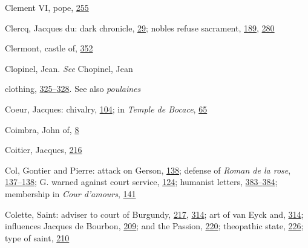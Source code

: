 Clement VI, pope,
\protect\hyperlink{17_Chapter_Ten__THE_FAILURE_OF_IMAG.xhtmlux5cux23page_255}{255}

Clercq, Jacques du: dark chronicle,
\protect\hyperlink{08_Chapter_One__THE_PASSIONATE_INTE.xhtmlux5cux23page_29}{29};
nobles refuse sacrament,
\protect\hyperlink{13_Chapter_Six__THE_DEPICTION_OF_TH.xhtmlux5cux23page_189}{189},
\protect\hyperlink{18_Chapter_Eleven__THE_FORMS_OF_THO.xhtmlux5cux23page_280}{280}

Clermont, castle of,
\protect\hyperlink{21_Chapter_Thirteen__IMAGE_AND_WORD.xhtmlux5cux23page_352}{352}

Clopinel, Jean. \emph{See} Chopinel, Jean

clothing,
\protect\hyperlink{20_ILLUSTRATIONS_FOLLOW_PAGE.xhtmlux5cux23page_325}{325--}\protect\hyperlink{20_ILLUSTRATIONS_FOLLOW_PAGE.xhtmlux5cux23page_328}{328}.
See also \emph{poulaines}

Coeur, Jacques: chivalry,
\protect\hyperlink{10_Chapter_Three__THE_HEROIC_DREAM.xhtmlux5cux23page_104}{104};
in \emph{Temple de Bocace},
\protect\hyperlink{10_Chapter_Three__THE_HEROIC_DREAM.xhtmlux5cux23page_65}{65}

Coimbra, John of,
\protect\hyperlink{08_Chapter_One__THE_PASSIONATE_INTE.xhtmlux5cux23page_8}{8}

Coitier, Jacques,
\protect\hyperlink{14_Chapter_Seven__THE_PIOUS_PERSONA.xhtmlux5cux23page_216}{216}

Col, Gontier and Pierre: attack on Gerson,
\protect\hyperlink{11_Chapter_Four__THE_FORMS_OF_LOVE.xhtmlux5cux23page_138}{138};
defense of \emph{Roman de la rose},
\protect\hyperlink{11_Chapter_Four__THE_FORMS_OF_LOVE.xhtmlux5cux23page_137}{137--}\protect\hyperlink{11_Chapter_Four__THE_FORMS_OF_LOVE.xhtmlux5cux23page_138}{138};
G. warned against court service,
\protect\hyperlink{10_Chapter_Three__THE_HEROIC_DREAM.xhtmlux5cux23page_124}{124};
humanist letters,
\protect\hyperlink{22_Chapter_Fourteen__THE_COMING_OF.xhtmlux5cux23page_383}{383--}\protect\hyperlink{22_Chapter_Fourteen__THE_COMING_OF.xhtmlux5cux23page_384}{384};
membership in \emph{Cour d'amours},
\protect\hyperlink{11_Chapter_Four__THE_FORMS_OF_LOVE.xhtmlux5cux23page_141}{141}

Colette, Saint: adviser to court of Burgundy,
\protect\hyperlink{14_Chapter_Seven__THE_PIOUS_PERSONA.xhtmlux5cux23page_217}{217},
\protect\hyperlink{20_ILLUSTRATIONS_FOLLOW_PAGE.xhtmlux5cux23page_314}{314};
art of van Eyck and,
\protect\hyperlink{20_ILLUSTRATIONS_FOLLOW_PAGE.xhtmlux5cux23page_314}{314};
influences Jacques de Bourbon,
\protect\hyperlink{14_Chapter_Seven__THE_PIOUS_PERSONA.xhtmlux5cux23page_209}{209};
and the Passion,
\protect\hyperlink{15_Chapter_Eight__RELIGIOUS_EXCITAT.xhtmlux5cux23page_220}{220};
theopathic state,
\protect\hyperlink{15_Chapter_Eight__RELIGIOUS_EXCITAT.xhtmlux5cux23page_226}{226};
type of saint,
\protect\hyperlink{14_Chapter_Seven__THE_PIOUS_PERSONA.xhtmlux5cux23page_210}{210}

